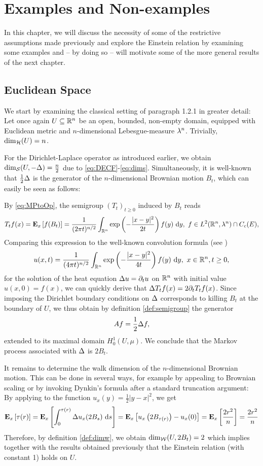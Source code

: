 \chapter{Examples and Non-examples}

In this chapter, we will discuss the necessity of some of the restrictive assumptions made previously and explore the Einstein relation by examining some examples and -- by doing so -- will motivate some of the more general results of the next chapter.

\section{Euclidean Space}

We start by examining the classical setting of paragraph 1.2.1 in greater detail: Let once again $U\ssq\IR^n$ be an open, bounded, non-empty domain, equipped with Euclidean metric and $n$-dimensional Lebesgue-measure $\gl^n$. Trivially, $\dimh(U)=n$. 

For the Dirichlet-Laplace operator as introduced earlier, we obtain 
$\dims(U,-\gD)=\frac{n}{2}$ due to \eqref{eq:DECF}-\eqref{eq:dims}. Simultaneously, it is well-known that $\frac{1}{2}\gD$ is the generator of the $n$-dimensional Brownian motion $B_t$, which can easily be seen as follows:

By \eqref{eq:MPtoOp}, the semigroup $(T_t)_{t\geq0}$ induced by $B_t$ reads
\[
  T_tf(x)
   =\PTEp{f(B_t)}{x}
   =\frac{1}{(2\pi t)^{n/2}}\int_{\IR^n} 
     \exp\left(-\frac{|x-y|^2}{2t}\right)f(y)\,\Di y,
  \ f\in L^2(\IR^n,\gl^n)\cap C_c(E),
\]
Comparing this expression to the well-known convolution formula (see \cite[p.47]{evans2010partial})
\[
  u(x,t)=\frac{1}{(4\pi t)^{n/2}}\int_{\IR^n} \exp\left(-\frac{|x-y|^2}{4t}\right)f(y)\,\Di y,\ x\in\IR^n, t\geq0,
\]
for the solution of the heat equation $\gD u=\partial_t u$ on $\IR^n$ with initial value $u(x,0)=f(x)$, we can quickly derive that $\gD T_tf(x)=2\partial_t T_tf(x)$. Since imposing the Dirichlet boundary conditions on $\gD$ corresponds to killing $B_t$ at the boundary of $U$, we thus obtain by definition \ref{def:semigroup} the generator
\[
  Af=\frac{1}{2}\gD f,
\]
extended to its maximal domain $H_0^1(U,\mu)$. We conclude that the Markov process associated with $\gD$ is $2B_t$.

It remains to determine the walk dimension of the $n$-dimensional Brownian motion. This can be done in several ways, for example by appealing to Brownian scaling or by invoking Dynkin's formula after a standard truncation argument: By applying \cite[Lemma 19.21]{kallenberg2002foundations} to the function $u_x(y)=\frac{1}{2}|y-x|^2$, we get
\[
  \PTEp{\tau(r)}{x}
  =\PTEp{\int_0^{\tau(r)}\gD u_x(2B_s)\,\Di s}{x}
  =\PTEp{u_x\left(2B_{\tau(r)}\right)-u_x(0)}{x}
  =\PTEp{\frac{2r^2}{n}}{x}
  =\frac{2r^2}{n}
\]
Therefore, by definition \ref{def:dimw}, we obtain $\dimw(U,2B_t)=2$ which implies together with the results obtained previously that the Einstein relation (with constant 1) holds on $U$. 



